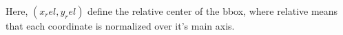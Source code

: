 Here, $(x_rel, y_rel)$ define the relative center of the \ac{bbox}, where relative means that each coordinate is normalized over it's main axis.